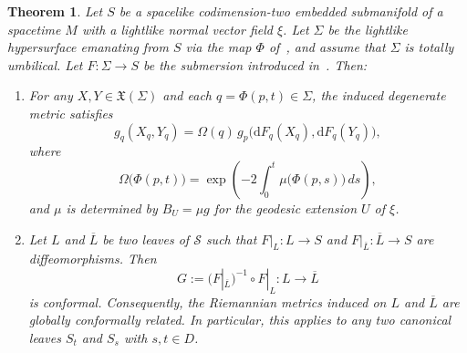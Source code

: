 \documentclass[11pt]{article}
\numberwithin{equation}{section}
\newtheorem{theorem}{Theorem}[section]
\begin{document}
	\begin{theorem}\label{Cor:ConformalRelation}
		Let $S$ be a spacelike codimension-two embedded submanifold of a
		spacetime $M$ with a lightlike normal vector field $\xi$. Let
		$\Sigma$ be the lightlike hypersurface emanating from $S$ via the
		map $\Phi$ of~, and assume that $\Sigma$ is totally
		umbilical. Let $F\colon\Sigma\to S$ be the submersion introduced
		in~. Then:
		\begin{enumerate}
			\item[(a)] For any $X,Y\in\mathfrak X(\Sigma)$ and each
			$q=\Phi(p,t)\in\Sigma$, the induced degenerate metric satisfies
			\begin{equation}\label{Eq:ConformalProperUmbilical_0}
				g_q(X_q,Y_q)
				=\Omega(q)\,
				g_p\bigl(\mathrm dF_q(X_q),\mathrm dF_q(Y_q)\bigr),
			\end{equation}
			where
			\begin{equation}\label{Eq:ConformalRemarkProperUmbilical}
				\Omega\bigl(\Phi(p,t)\bigr)
				=\exp\left(-2\!\int_0^t
				\mu\bigl(\Phi(p,s)\bigr)\,ds\right),
			\end{equation}
			and $\mu$ is determined by $B_U=\mu g$ for the geodesic
			extension $U$ of $\xi$.

			\item[(b)] Let $L$ and $\overline L$ be two leaves of
			$\mathcal S$ such that
			$F|_L\colon L\to S$ and
			$F|_{\overline L}\colon\overline L\to S$ are diffeomorphisms.
			Then
			\[
				G:=(F|_{\overline L})^{-1}\circ F|_L
				\colon L\longrightarrow\overline L
			\]
			is conformal. Consequently, the Riemannian metrics induced on
			$L$ and $\overline L$ are globally conformally related.
			In particular, this applies to any two canonical leaves
			$S_t$ and $S_s$ with $s,t\in D$.
		\end{enumerate}
	\end{theorem}
\end{document}
